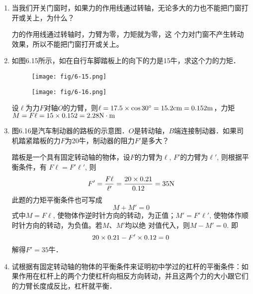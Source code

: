 \begin{enumerate}
    \item 当我们开关门窗时，如果力的作用线通过转轴，无论多大的力也不能把门窗打开或关上，为什么？

  \begin{solution}
        力的作用线通过转轴时，力臂为零，力矩就为零，这
        个力对门窗不产生转动效果，所以不能把门窗打开或关上。
    \end{solution}
  
    \item 如图6.15所示，如在自行车脚踏板上的向下的力是15牛，求这个力的力矩．
    \begin{figure}[htp]\centering
        \begin{minipage}[t]{0.48\textwidth}
        \centering
    \texttt{[image: fig/6-15.png]}
        \caption{}
        \end{minipage}
        \begin{minipage}[t]{0.48\textwidth}
        \centering
    \texttt{[image: fig/6-16.png]}
        \caption{}
        \end{minipage}
        \end{figure}


\begin{solution}
    设$\ell$为力$F$对轴$O$的力臂，则$\ell =17.5\times\cos30^{\circ}=15.2{\rm cm}=0.152{\rm m}$，力矩$M=F\ell=15\times0.152=2.28{\rm N\cdot m}$
\end{solution}

    \item 图6.16是汽车制动器的路板的示意图．$O$是转动轴，$B$端连接制动器．如果司机踏紧踏板的力$F$为20牛，制动器的阻力$F'$是多大？

\begin{solution}
    踏板是一个具有固定转动轴的物体，设$F$的力臂为$\ell$, $F'$的力臂为$\ell'$, 则根据平衡条件，有
    $F\ell=F'\ell'$, 则
\[F'=\frac{F\ell }{\ell'}=\frac{20\times 0.21}{0.12}=35{\rm N}\]
此题的力矩平衡条件也可写成
\[M+M'=0\]
式中$M=F\ell$, 使物体作逆时针方向的转动，为正值；$M'=
F'\ell'$, 使物体作顺时针方向的转动，为负值。若$M$、$M'$均以绝
对值代入，则$M-M'=0$. 即
\[20\times0.21-F'\times0.12=0\]
解得$F'=35$牛．
\end{solution}

    \item 试根据有固定转动轴的物体的平衡条件来证明初中学过的杠杆的平衡条件：如果作用在杠杆上的两个力使杠杆向相反方向转动，并且这两个力的大小跟它们的力臂长度成反比，杠杆就平衡．
    \begin{figure}[htp]
        \centering   
{}
\end{figure}
\end{enumerate}
